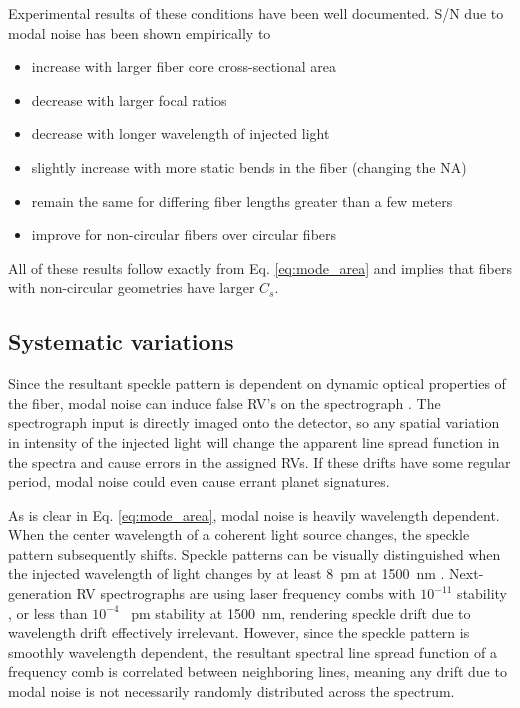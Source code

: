 \documentclass[twocolumn]{emulateapj}
\begin{document}
Experimental results of these conditions have been well documented. S/N due to modal noise has been shown empirically to
\begin{itemize}
\item increase with larger fiber core cross-sectional area \citep{Sablowski2015, Lemke2010}
\item decrease with larger focal ratios \citep{Sablowski2015, Baudrand2001}
\item decrease with longer wavelength of injected light \citep{Baudrand2001}
\item slightly increase with more static bends in the fiber (changing the NA) \citep{Imai1979}
\item remain the same for differing fiber lengths greater than a few meters \citep{Baudrand2001}
\item improve for non-circular fibers over circular fibers \citep{Sturmer2016, Sablowski2015}
\end{itemize}
All of these results follow exactly from Eq. \ref{eq:mode_area} and implies that fibers with non-circular geometries have larger $C_{s}$.

\subsection{Systematic variations}
\label{subsec:sys_var}

Since the resultant speckle pattern is dependent on dynamic optical properties of the fiber, modal noise can induce false RV's on the spectrograph \citep{Mahadevan2014}. The spectrograph input is directly imaged onto the detector, so any spatial variation in intensity of the injected light will change the apparent line spread function in the spectra and cause errors in the assigned RVs. If these drifts have some regular period, modal noise could even cause errant planet signatures.

As is clear in Eq. \ref{eq:mode_area}, modal noise is heavily wavelength dependent. When the center wavelength of a coherent light source changes, the speckle pattern subsequently shifts.  Speckle patterns can be visually distinguished when the injected wavelength of light changes by at least \SI{8}{\pico\meter} at \SI{1500}{\nano\meter} \citep{Redding2013}. Next-generation RV spectrographs are using laser frequency combs with $10^{-11}$ stability \citep{Probst2014}, or less than $10^{-4}$ \SI{}{\pico\meter} stability at \SI{1500}{\nano\meter}, rendering speckle drift due to wavelength drift effectively irrelevant. However, since the speckle pattern is smoothly wavelength dependent, the resultant spectral line spread function of a frequency comb is correlated between neighboring lines, meaning any drift due to modal noise is not necessarily randomly distributed across the spectrum.
\end{document}
